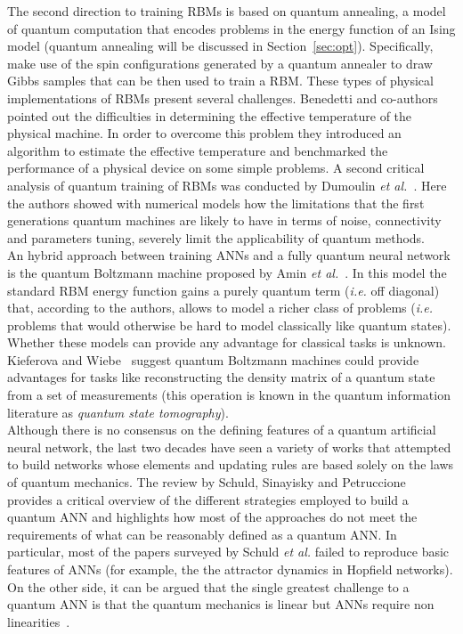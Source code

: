 \documentclass[a4paper, 11pt]{article}
\begin{document}
The second direction to training RBMs is based on quantum annealing, a model of quantum computation that encodes problems in the energy function of an Ising model (quantum annealing will be discussed in Section~\ref{sec:opt}). Specifically,~\cite{adachi2015application, denil2011toward} make use of the spin configurations generated by a quantum annealer to draw Gibbs samples that can be then used to train a RBM. These types of physical implementations of RBMs present several challenges. Benedetti and co-authors~\cite{benedetti2016estimation} pointed out the difficulties in determining the effective temperature of the physical machine. In order to overcome this problem they introduced an algorithm to estimate the effective temperature and benchmarked the performance of a physical device on some simple problems. A second critical analysis of quantum training of RBMs was conducted by Dumoulin \textit{et al.}~\cite{dumoulin2014challenges}. Here the authors showed with numerical models how the limitations that the first generations quantum machines are likely to have in terms of noise, connectivity and parameters tuning, severely limit the applicability of quantum methods.\\

An hybrid approach between training ANNs and a fully quantum neural network is the quantum Boltzmann machine proposed by Amin \textit{et al.}~\cite{amin2016quantum}. In this model the standard RBM energy function gains a purely quantum term (\textit{i.e.} off diagonal) that, according to the authors, allows to model a richer class of problems (\textit{i.e.} problems that would otherwise be hard to model classically like quantum states). Whether these models can provide any advantage for classical tasks is unknown. Kieferova and Wiebe~\cite{kieferova2016tomography} suggest quantum Boltzmann machines could provide advantages for tasks like reconstructing the density matrix of a quantum state from a set of measurements (this operation is known in the quantum information literature as \textit{quantum state tomography}).\\

Although there is no consensus on the defining features of a quantum artificial neural network, the last two decades have seen a variety of works that attempted to build networks whose elements and updating rules are based solely on the laws of quantum mechanics. The review by Schuld, Sinayisky and Petruccione~\cite{schuld2014quest} provides a critical overview of the different strategies employed to build a quantum ANN and highlights how most of the approaches do not meet the requirements of what can be reasonably defined as a quantum ANN. In particular, most of the papers surveyed by Schuld \textit{et al.} failed to reproduce basic features of ANNs (for example, the the attractor dynamics in Hopfield networks). On the other side, it can be argued that the single greatest challenge to a quantum ANN is that the quantum mechanics is linear but ANNs require non linearities~\cite{cybenko1989approximation}.\\
\end{document}

